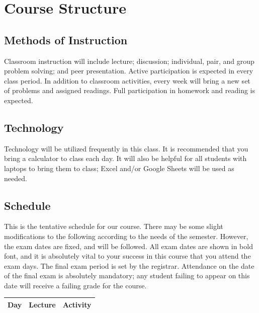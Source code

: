\documentclass[11pt]{article}
\begin{document}

\section*{Course Structure}

\subsection*{Methods of Instruction}
Classroom instruction will include lecture; discussion; individual,
pair, and group problem solving; and peer presentation. Active participation is expected in every class period. In addition to classroom activities, every week will bring a new set of problems and assigned readings.  Full participation in homework and reading is expected.

\subsection*{Technology}
Technology will be utilized frequently in this class. It is recommended that you bring a calculator to
class each day. It will also be helpful for all students with laptops to bring them to class; Excel and/or Google Sheets will be
used as needed.


\newpage
\subsection*{Schedule}

This is the tentative schedule for our course.  There may be some slight modifications to 
the following according to the needs of the semester. However, the exam dates are
fixed, and will be followed.  All exam dates are shown in bold font, and it is absolutely 
vital to your success in this course that you attend the exam days.  The final exam
period is set by the registrar.  Attendance on the date of the final exam is absolutely
mandatory; any student failing to appear on this date will receive a failing grade for
the course.

\begin{longtable}{|ll|l|l|}
\hline
\multicolumn{2}{|l|}{\bf Day} & {\bf Lecture} & {\bf Activity}\\
\hline
\endhead

\end{longtable}
\end{document}
